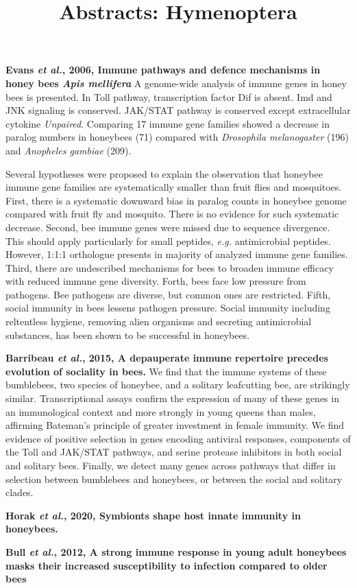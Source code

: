 \documentclass[11pt]{article}
\title{Abstracts: Hymenoptera}
\author{}
\date{}
\begin{document}
\begin{sloppypar}
  \maketitle

  \linenumbers
\textbf{Evans \textit{et al.}, 2006, Immune pathways and defence mechanisms in honey bees \textit{Apis mellifera}} \newline
A genome-wide analysis of immune genes in honey bees is presented. 
In Toll pathway, transcription factor Dif is absent. 
Imd and JNK signaling is conserved. 
JAK/STAT pathway is conserved except extracellular cytokine \textit{Unpaired}. 
Comparing 17 immune gene families showed a decrease in paralog numbers in honeybees (71) compared with \textit{Drosophila melanogaster} (196) and \textit{Anopheles gambiae} (209). 
\par
Several hypotheses were proposed to explain the observation that honeybee immune gene families are systematically smaller than fruit flies and mosquitoes. 
First, there is a systematic downward bias in paralog counts in honeybee genome compared with fruit fly and mosquito. 
There is no evidence for such systematic decrease. 
Second, bee immune genes were missed due to sequence divergence. 
This should apply particularly for small peptides, \textit{e.g.} antimicrobial peptides. 
However, 1:1:1 orthologue presents in majority of analyzed immune gene families. 
Third, there are undescribed mechanisms for bees to broaden immune efficacy with reduced immune gene diversity. 
Forth, bees face low pressure from pathogens. 
Bee pathogens are diverse, but common ones are restricted. 
Fifth, social immunity in bees lessens pathogen pressure. 
Social immunity including reltentless hygiene, removing alien organisms and secreting antimicrobial substances, has been shown to be successful in honeybees. 
\par
\textbf{Barribeau \textit{et al.}, 2015, A depauperate immune repertoire precedes evolution of sociality in bees.} \newline
We find that the immune systems of these bumblebees, two species of honeybee, and a solitary leafcutting bee, are strikingly similar. 
Transcriptional assays confirm the expression of many of these genes in an immunological context and more strongly in young queens than males, affirming Bateman’s principle of greater investment in female immunity. 
We find evidence of positive selection in genes encoding antiviral responses, components of the Toll and JAK/STAT pathways, and serine protease inhibitors in both social and solitary bees. 
Finally, we detect many genes across pathways that differ in selection between bumblebees and honeybees, or between the social and solitary clades.
\par
\textbf{Horak \textit{et al.}, 2020, Symbionts shape host innate immunity in honeybees.} \newline
\par
\textbf{Bull \textit{et al.}, 2012, A strong immune response in young adult honeybees masks their increased susceptibility to infection compared to older bees}
\end{sloppypar}
\end{document}
